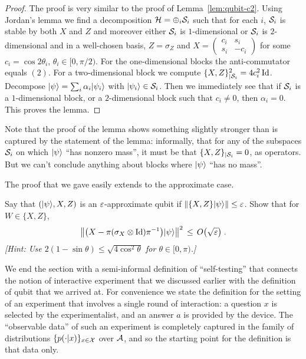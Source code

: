 \begin{proof}
The proof is very similar to the proof of Lemma~\ref{lem:qubit-c2}. Using Jordan's lemma we find a decomposition $\mathcal{H} = \oplus_i \mathcal{S}_i$ such that for each $i$, $\mathcal{S}_i$ is stable by both $X$ and $Z$ and moreover either $\mathcal{S}_i$ is $1$-dimensional or $\mathcal{S}_i$ is $2$-dimensional and in a well-chosen basis, $Z = \sigma_Z$ and $X = \begin{pmatrix} c_i & s_i \\ s_i & -c_i \end{pmatrix}$ for some $c_i = \cos 2\theta_i$, $\theta_i \in [0,\pi/2)$. For the one-dimensional blocks the anti-commutator equals $(2)$. For a two-dimensional block we compute $\{X,Z\}^2_{|\mathcal{S}_i} = 4 c_i^2 \mathop{\rm Id}\nolimits$. Decompose $|\psi\rangle = \sum_i \alpha_i |\psi_i\rangle$ with $|\psi_i\rangle \in \mathcal{S}_i$. Then we immediately see that if $\mathcal{S}_i$ is a $1$-dimensional block, or a $2$-dimensional block such that $c_i \neq 0$, then $\alpha_i = 0$. This proves the lemma. 
\end{proof}

Note that the proof of the lemma shows something slightly stronger than is captured by the statement of the lemma: informally, that for any of the subspaces $\mathcal{S}_i$ on which $|\psi\rangle$ ``has nonzero mass'', it must be that $\{X,Z\}_{|\mathcal{S}_i}=0$, as operators. But we can't conclude anything about blocks where $|\psi\rangle$ ``has no mass''. 

The proof that we gave easily extends to the approximate case. 

\begin{exercise}
Say that $(|\psi\rangle,X,Z)$ is an $\varepsilon$-approximate qubit if $\|\{X,Z\}|\psi\rangle\|\leq \varepsilon$. Show that for $W\in \{X,Z\}$, 
\[ \big\|\big( X - \pi (\sigma_X \otimes \mathop{\rm Id}\nolimits )\pi^{-1} \big)|\psi\rangle\big\|^2 \,\leq\, O\big(\sqrt{\varepsilon}\big)\;.\] 
\emph{[Hint: Use $2(1-\sin\theta) \leq \sqrt{4\cos^2\theta}$ for $\theta\in[0,\pi)$.]}
\end{exercise}

We end the section with a semi-informal definition of ``self-testing'' that connects the notion of interactive experiment that we discussed earlier with the definition of qubit that we arrived at. For convenience we state the definition for the setting of an experiment that involves a single round of interaction: a question $x$ is selected by the experimentalist, and an answer $a$ is provided by the device. The ``observable data'' of such an experiment is completely captured in the family of distributions $\{p(\cdot|x)\}_{x\in \mathcal{X}}$ over $\mathcal{A}$, and so the starting point for the definition is that data only. 


